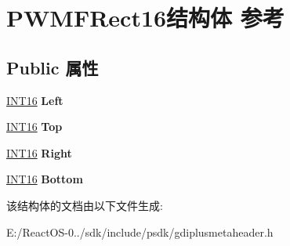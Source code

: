 \hypertarget{struct_p_w_m_f_rect16}{}\section{P\+W\+M\+F\+Rect16结构体 参考}
\label{struct_p_w_m_f_rect16}
\subsection*{Public 属性}
\begin{DoxyCompactItemize}
\item 
\mbox{\label{struct_p_w_m_f_rect16_ac31e32b4a27832020fe49f49e9812866}} 
\hyperlink{_processor_bind_8h_a30f500129d8c688af07726d5d34ce52d}{I\+N\+T16} {\bfseries Left}
\item 
\mbox{\label{struct_p_w_m_f_rect16_a1ed95e38f34f2bcfd6ff23d210ffe78d}} 
\hyperlink{_processor_bind_8h_a30f500129d8c688af07726d5d34ce52d}{I\+N\+T16} {\bfseries Top}
\item 
\mbox{\label{struct_p_w_m_f_rect16_a4387980c1452e5cbe3a14647dd86bb29}} 
\hyperlink{_processor_bind_8h_a30f500129d8c688af07726d5d34ce52d}{I\+N\+T16} {\bfseries Right}
\item 
\mbox{\label{struct_p_w_m_f_rect16_a42aaf1e1214c5c634b444d1de7b9254d}} 
\hyperlink{_processor_bind_8h_a30f500129d8c688af07726d5d34ce52d}{I\+N\+T16} {\bfseries Bottom}
\end{DoxyCompactItemize}


该结构体的文档由以下文件生成\+:\begin{DoxyCompactItemize}
\item 
E\+:/\+React\+O\+S-\/0../sdk/include/psdk/gdiplusmetaheader.\+h\end{DoxyCompactItemize}
